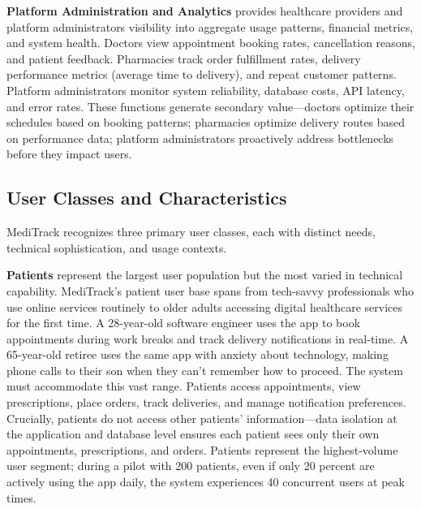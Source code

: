 \documentclass[12pt,a4paper]{report}
\begin{document}
\textbf{Platform Administration and Analytics} provides healthcare providers and platform administrators visibility into aggregate usage patterns, financial metrics, and system health. Doctors view appointment booking rates, cancellation reasons, and patient feedback. Pharmacies track order fulfillment rates, delivery performance metrics (average time to delivery), and repeat customer patterns. Platform administrators monitor system reliability, database costs, API latency, and error rates. These functions generate secondary value—doctors optimize their schedules based on booking patterns; pharmacies optimize delivery routes based on performance data; platform administrators proactively address bottlenecks before they impact users.

\subsection{User Classes and Characteristics}

MediTrack recognizes three primary user classes, each with distinct needs, technical sophistication, and usage contexts.

\textbf{Patients} represent the largest user population but the most varied in technical capability. MediTrack's patient user base spans from tech-savvy professionals who use online services routinely to older adults accessing digital healthcare services for the first time. A 28-year-old software engineer uses the app to book appointments during work breaks and track delivery notifications in real-time. A 65-year-old retiree uses the same app with anxiety about technology, making phone calls to their son when they can't remember how to proceed. The system must accommodate this vast range. Patients access appointments, view prescriptions, place orders, track deliveries, and manage notification preferences. Crucially, patients do not access other patients' information—data isolation at the application and database level ensures each patient sees only their own appointments, prescriptions, and orders. Patients represent the highest-volume user segment; during a pilot with 200 patients, even if only 20 percent are actively using the app daily, the system experiences 40 concurrent users at peak times.
\end{document}
